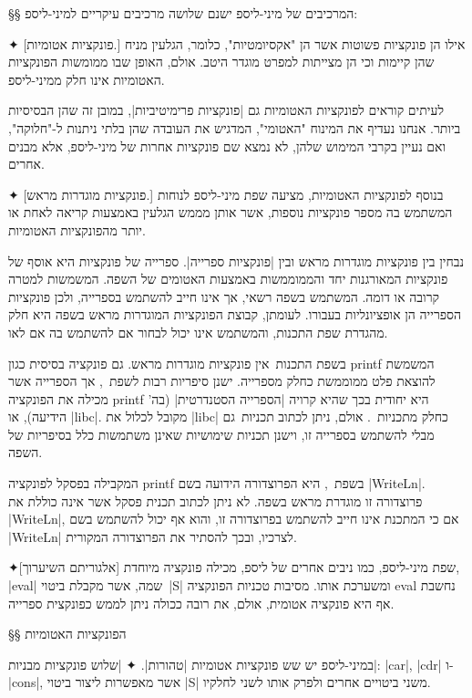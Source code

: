 §§ המרכיבים של מיני-ליספ
ישנם שלושה מרכיבים עיקריים למיני-ליספ:
\begin{description}
  ✦ [פונקציות אטומיות.] אילו הן פונקציות פשוטות אשר הן "אקסיומטיות", כלומר,
  הגלעין מניח שהן קיימות וכי הן מצייתות למפרט מוגדר היטב. אולם, האופן שבו
  ממומשות הפונקציות האטומיות אינו חלק ממיני-ליספ.

  לעיתים קוראים לפונקציות האטומיות גם \ע|פונקציות פרימיטיביות|, במובן זה שהן
  הבסיסיות ביותר. אנחנו נעדיף את המינוח "האטומי", המדגיש את העובדה שהן בלתי
  ניתנות ל-"חלוקה", ואם נעיין בקרבי המימוש שלהן, לא נמצא שם פונקציות אחרות של
  מיני-ליספ, אלא מבנים אחרים.

  ✦ [פונקציות מוגדרות מראש.] בנוסף לפונקציות האטומיות, מציעה שפת מיני-ליספ
  לנוחות המשתמש בה מספר פונקציות נוספות, אשר אותן מממש הגלעין באמצעות קריאה
  לאחת או יותר מהפונקציות האטומיות.

  נבחין בין פונקציות מוגדרות מראש ובין \ע|פונקציות ספרייה|. ספרייה של פונקציות
  היא אוסף של פונקציות המאורגנות יחד והממוממשות באמצעות האטומים של השפה.
  המשמשות למטרה קרובה או דומה. המשתמש בשפה רשאי, אך אינו חייב להשתמש בספרייה,
  ולכן פונקציות הספרייה הן אופציונליות בעבורו. לעומתן, קבוצת הפונקציות המוגדרות
  מראש בשפה היא חלק מהגדרת שפת התכנות, והמשתמש אינו יכול לבחור אם להשתמש בה אם
  לאו.

  בשפת התכנות~\CPL אין פונקציות מוגדרות מראש. גם פונקציה בסיסית כגון printf
  המשמשת להוצאת פלט ממוממשת כחלק מספרייה. ישנן סיפריות רבות לשפת~\CPL, אך
  הספרייה אשר מכילה את הפונקציה printf היא יחודית בכך שהיא קרויה \ע|הספרייה
  הסטנדרטית| (בה' הידיעה), או \E|libc|. מקובל לכלול את \E|libc| כחלק
  מתכניות~\CPL. אולם, ניתן לכתוב תכניות~\CPL גם מבלי להשתמש בספרייה זו, וישנן
  תכניות שימושיות שאינן משתמשות כלל בסיפריות של השפה.

  המקבילה בפסקל לפונקציה printf בשפת~\CPL, היא הפרוצדורה הידועה בשם
  \E|WriteLn|. פרוצדורה זו מוגדרת מראש בשפה. לא ניתן לכתוב תכנית פסקל אשר אינה
  כוללת את \E|WriteLn|, אם כי המתכנת אינו חייב להשתמש בפרוצדורה זו, והוא אף
  יכול להשתמש בשם \E|WriteLn| לצרכיו, ובכך להסתיר את הפרוצדורה המקורית.

  ✦[אלגוריתם השיערוך] שפת מיני-ליספ, כמו ניבים אחרים של ליספ, מכילה פונקציה
  מיוחדת, \E|eval| שמה, אשר מקבלת ביטוי~\E|S| ומשערכת אותו. מסיבות טכניות
  הפונקציה eval נחשבת אף היא פונקציה אטומית, אולם, את רובה ככולה ניתן לממש
  כפונקצית ספרייה.
\end{description}

§§ הפונקציות האטומיות

במיני-ליספ יש שש פונקציות אטומיות \ע|טהורות|.
✦ \ע|שלוש פונקציות מבניות|: \E|car|, \E|cdr| ו-\E|cons|, אשר מאפשרות ליצור
ביטוי \E|S| משני ביטויים אחרים ולפרק אותו לשני לחלקיו.

